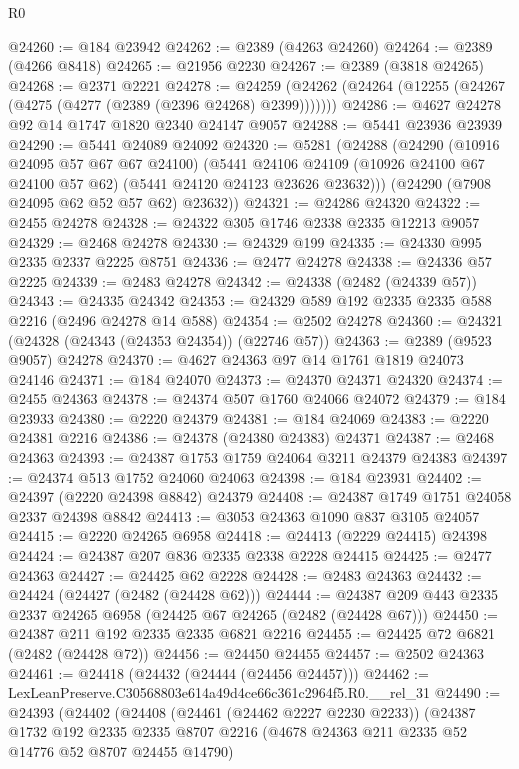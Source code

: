 \begin{lexlean}{R0}
\begin{coremodule}
@24260 := @184 @23942
@24262 := @2389 (@4263 @24260)
@24264 := @2389 (@4266 @8418)
@24265 := @21956 @2230
@24267 := @2389 (@3818 @24265)
@24268 := @2371 @2221
@24278 := @24259 (@24262 (@24264 (@12255 (@24267 (@4275 (@4277 (@2389 (@2396 @24268) @2399)))))))
@24286 := @4627 @24278 @92 @14 @1747 @1820 @2340 @24147 @9057
@24288 := @5441 @23936 @23939
@24290 := @5441 @24089 @24092
@24320 := @5281
    (@24288
      (@24290
        (@10916 @24095 @57 @67 @67 @24100)
        (@5441
          @24106
          @24109
          (@10926 @24100 @67 @24100 @57 @62)
          (@5441 @24120 @24123 @23626 @23632)))
      (@24290 (@7908 @24095 @62 @52 @57 @62) @23632))
@24321 := @24286 @24320
@24322 := @2455 @24278
@24328 := @24322 @305 @1746 @2338 @2335 @12213 @9057
@24329 := @2468 @24278
@24330 := @24329 @199
@24335 := @24330 @995 @2335 @2337 @2225 @8751
@24336 := @2477 @24278
@24338 := @24336 @57 @2225
@24339 := @2483 @24278
@24342 := @24338 (@2482 (@24339 @57))
@24343 := @24335 @24342
@24353 := @24329 @589 @192 @2335 @2335 @588 @2216 (@2496 @24278 @14 @588)
@24354 := @2502 @24278
@24360 := @24321 (@24328 (@24343 (@24353 @24354)) (@22746 @57))
@24363 := @2389 (@9523 @9057) @24278
@24370 := @4627 @24363 @97 @14 @1761 @1819 @24073 @24146
@24371 := @184 @24070
@24373 := @24370 @24371 @24320
@24374 := @2455 @24363
@24378 := @24374 @507 @1760 @24066 @24072
@24379 := @184 @23933
@24380 := @2220 @24379
@24381 := @184 @24069
@24383 := @2220 @24381 @2216
@24386 := @24378 (@24380 @24383) @24371
@24387 := @2468 @24363
@24393 := @24387 @1753 @1759 @24064 @3211 @24379 @24383
@24397 := @24374 @513 @1752 @24060 @24063
@24398 := @184 @23931
@24402 := @24397 (@2220 @24398 @8842) @24379
@24408 := @24387 @1749 @1751 @24058 @2337 @24398 @8842
@24413 := @3053 @24363 @1090 @837 @3105 @24057
@24415 := @2220 @24265 @6958
@24418 := @24413 (@2229 @24415) @24398
@24424 := @24387 @207 @836 @2335 @2338 @2228 @24415
@24425 := @2477 @24363
@24427 := @24425 @62 @2228
@24428 := @2483 @24363
@24432 := @24424 (@24427 (@2482 (@24428 @62)))
@24444 := @24387 @209 @443 @2335 @2337 @24265 @6958 (@24425 @67 @24265 (@2482 (@24428 @67)))
@24450 := @24387 @211 @192 @2335 @2335 @6821 @2216
@24455 := @24425 @72 @6821 (@2482 (@24428 @72))
@24456 := @24450 @24455
@24457 := @2502 @24363
@24461 := @24418 (@24432 (@24444 (@24456 @24457)))
@24462 := LexLeanPreserve.C30568803e614a49d4ce66c361c2964f5.R0.__rel_31
@24490 := @24393
    (@24402
      (@24408
        (@24461 (@24462 @2227 @2230 @2233))
        (@24387
          @1732
          @192
          @2335
          @2335
          @8707
          @2216
          (@4678 @24363 @211 @2335 @52 @14776 @52 @8707 @24455 @14790)

\end{coremodule}
\end{lexlean}
